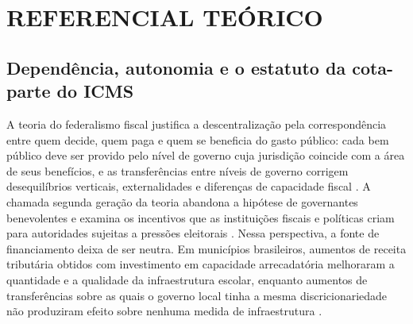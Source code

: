 \section{REFERENCIAL TEÓRICO}\label{sec:referencial}



\subsection{Dependência, autonomia e o estatuto da cota-parte do ICMS}\label{sec:conceitos}

A teoria do federalismo fiscal justifica a descentralização pela correspondência entre quem decide, quem paga e quem se beneficia do gasto público: cada bem público deve ser provido pelo nível de governo cuja jurisdição coincide com a área de seus benefícios, e as transferências entre níveis de governo corrigem desequilíbrios verticais, externalidades e diferenças de capacidade fiscal \citep{Oates1999}. A chamada segunda geração da teoria abandona a hipótese de governantes benevolentes e examina os incentivos que as instituições fiscais e políticas criam para autoridades sujeitas a pressões eleitorais \citep{Weingast2014}. Nessa perspectiva, a fonte de financiamento deixa de ser neutra. Em municípios brasileiros, aumentos de receita tributária obtidos com investimento em capacidade arrecadatória melhoraram a quantidade e a qualidade da infraestrutura escolar, enquanto aumentos de transferências sobre as quais o governo local tinha a mesma discricionariedade não produziram efeito sobre nenhuma medida de infraestrutura \citep{Gadenne2017}.

